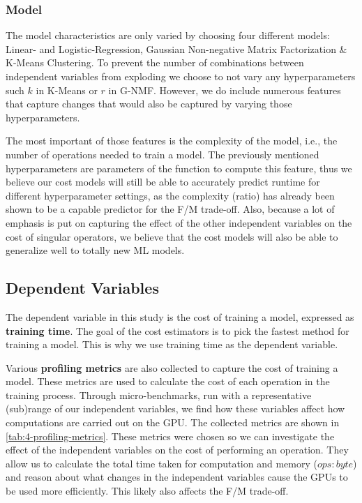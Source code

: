 \subsubsection{Model}
The model characteristics are only varied by choosing four different models: Linear- and Logistic-Regression, Gaussian Non-negative Matrix Factorization \& K-Means Clustering. To prevent the number of combinations between independent variables from exploding we choose to not vary any hyperparameters such $k$ in K-Means or $r$ in G-NMF. However, we do include numerous features that capture changes that would also be captured by varying those hyperparameters.

The most important of those features is the complexity of the model, i.e., the number of operations needed to train a model. The previously mentioned hyperparameters are parameters of the function to compute this feature, thus we believe our cost models will still be able to accurately predict runtime for different hyperparameter settings, as the complexity (ratio) has already been shown to be a capable predictor for the F/M trade-off. Also, because a lot of emphasis is put on capturing the effect of the other independent variables on the cost of singular operators, we believe that the cost models will also be able to generalize well to totally new ML models.

\subsection{Dependent Variables}

The dependent variable in this study is the cost of training a model, expressed as \textbf{training time}. The goal of the cost estimators is to pick the fastest method for training a model. This is why we use training time as the dependent variable.

Various \textbf{profiling metrics} are also collected to capture the cost of training a model. These metrics are used to calculate the cost of each operation in the training process. Through micro-benchmarks, run with a representative (sub)range of our independent variables, we find how these variables affect how computations are carried out on the GPU. The collected metrics are shown in \autoref{tab:4-profiling-metrics}. These metrics were chosen so we can investigate the effect of the independent variables on the cost of performing an operation. They allow us to calculate the total time taken for computation and memory ($ops:byte$) and reason about what changes in the independent variables cause the GPUs to be used more efficiently. This likely also affects the F/M trade-off.

